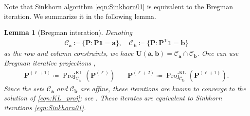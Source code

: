 \documentclass[11pt]{book}
\newtheorem{lemma}[theorem]{Lemma}
\begin{document}
Note that Sinkhorn algorithm \eqref{eqn:Sinkhorn01} is equivalent to the Bregman iteration. We summarize it in the following lemma.
\begin{lemma}[Bregman interation]
Denoting
\begin{align*}
    \mathcal{C}_\mathbf{a} \coloneqq \{\mathbf{P} : \mathbf{P} \mathbb{1} = \mathbf{a} \},  
    \quad \mathcal{C}_\mathbf{b} \coloneqq \{\mathbf{P} : \mathbf{P}^\mathrm{T} \mathbb{1} = \mathbf{b} \}
\end{align*}
as the row and column constraints, we have $\mathbf{U}(\mathbf{a}, \mathbf{b}) = \mathcal{C}_\mathbf{a} \cap \mathcal{C}_\mathbf{b}$. One can use Bregman iterative projections \cite{bregman1967relaxation},  
\begin{align}\label{eqn:Bregman}
    \mathbf{P}^{(\ell+1)} \coloneqq \operatorname{Proj}^{\operatorname{KL}}_{\mathcal{C}_\mathbf{a}} (\mathbf{P}^{(\ell)})  
    & \quad  
    \mathbf{P}^{(\ell+2)} \coloneqq \operatorname{Proj}^{\operatorname{KL}}_{\mathcal{C}_\mathbf{b}} (\mathbf{P}^{(\ell+1)}).
\end{align}
Since the sets $\mathcal{C}_\mathbf{a}$ and $\mathcal{C}_\mathbf{b}$ are affine, these iterations are known to converge to the solution of \eqref{eqn:KL_proj}; see \cite{bregman1967relaxation}. These iterates are equivalent to Sinkhorn iterations \eqref{eqn:Sinkhorn01}.
\end{lemma}
\end{document}
